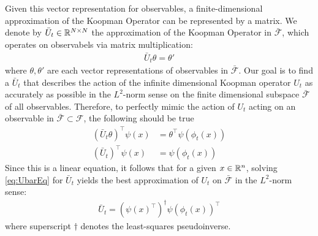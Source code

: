 Given this vector representation for observables, a finite-dimensional approximation of the Koopman Operator can be represented by a matrix.
We denote by $\bar{U}_t \in \mathbb{R}^{N \times N}$ the approximation of the Koopman Operator in $\bar{\mathcal{F}}$, which operates on observabels via matrix multiplication:
\begin{align}
    \bar{U}_t \theta = \theta'
\end{align}
where $\theta , \theta'$ are each vector representations of observables in $\bar{\mathcal{F}}$.
Our goal is to find a $\bar{U}_t$ that describes the action of the infinite dimensional Koopman operator $U_t$ as accurately as possible in the $L^2$-norm sense on the finite dimensional subspace $\bar{\mathcal{F}}$  of all observables.
Therefore, to perfectly mimic the action of $U_t$ acting on an observable in $\bar{\mathcal{F}} \subset \mathcal{F}$, the following should be true
\begin{align}
    ( \bar{U}_t {\theta} )^\top {\psi}(x) &=
    {\theta}^\top {\psi} \left( \phi_t(x) \right) \\
    ( \bar{U}_t )^\top \psi(x) &= {\psi} \left( \phi_t(x) \right)
    \label{eq:UbarEq}
\end{align}
Since this is a linear equation, it follows that for a given ${x \in \mathbb{R}^n}$, solving \eqref{eq:UbarEq} for $\bar{U}_t$ yields the best approximation of $U_t$ on $\bar{\mathcal{F}}$ in the $L^2$-norm sense:
\begin{align}
    \bar{U}_t = \left( {\psi}(x)^\top \right)^\dagger {\psi}( \phi_t(x) )^\top
    \label{eq:Uapprox}
\end{align}
where superscript $\dagger$ denotes the least-squares pseudoinverse.

